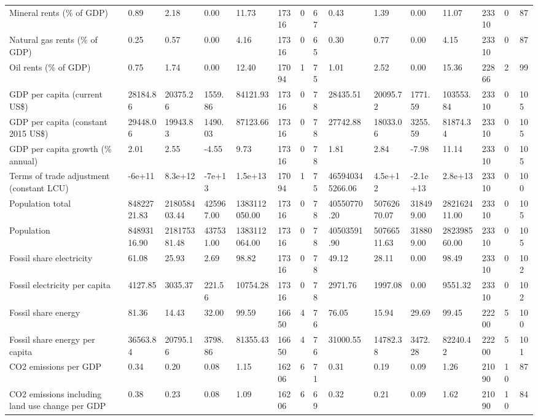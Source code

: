 \begin{longtable}{lllllllllllllll}
\addlinespace
Mineral rents (\% of GDP) & 0.89 & 2.18 & 0.00 & 11.73 & 17316 & 0 & 67 & 0.43 & 1.39 & 0.00 & 11.07 & 23310 & 0 & 87\\
Natural gas rents (\% of GDP) & 0.25 & 0.57 & 0.00 & 4.16 & 17316 & 0 & 65 & 0.30 & 0.77 & 0.00 & 4.15 & 23310 & 0 & 87\\
Oil rents (\% of GDP) & 0.75 & 1.74 & 0.00 & 12.40 & 17094 & 1 & 75 & 1.01 & 2.52 & 0.00 & 15.36 & 22866 & 2 & 99\\
GDP per capita (current US\$) & 28184.86 & 20375.26 & 1559.86 & 84121.93 & 17316 & 0 & 78 & 28435.51 & 20095.72 & 1771.59 & 103553.84 & 23310 & 0 & 105\\
GDP per capita (constant 2015 US\$) & 29448.06 & 19943.83 & 1490.03 & 87123.66 & 17316 & 0 & 78 & 27742.88 & 18033.06 & 3255.59 & 81874.34 & 23310 & 0 & 105\\
\addlinespace
GDP per capita growth (\% annual) & 2.01 & 2.55 & -4.55 & 9.73 & 17316 & 0 & 78 & 1.81 & 2.84 & -7.98 & 11.14 & 23310 & 0 & 105\\
Terms of trade adjustment (constant LCU) & -6e+11 & 8.3e+12 & -7e+13 & 1.5e+13 & 17094 & 1 & 75 & 465940345266.06 & 4.5e+12 & -2.1e+13 & 2.8e+13 & 23310 & 0 & 100\\
Population total & 84822721.83 & 218058403.44 & 425967.00 & 1383112050.00 & 17316 & 0 & 78 & 40550770.20 & 50762670.07 & 318499.00 & 282162411.00 & 23310 & 0 & 105\\
Population & 84893116.90 & 218175381.48 & 437531.00 & 1383112064.00 & 17316 & 0 & 78 & 40503591.90 & 50766511.63 & 318809.00 & 282398560.00 & 23310 & 0 & 105\\
Fossil share electricity & 61.08 & 25.93 & 2.69 & 98.82 & 17316 & 0 & 78 & 49.12 & 28.11 & 0.00 & 98.49 & 23310 & 0 & 102\\
\addlinespace
Fossil electricity per capita & 4127.85 & 3035.37 & 221.56 & 10754.28 & 17316 & 0 & 78 & 2971.76 & 1997.08 & 0.00 & 9551.32 & 23310 & 0 & 102\\
Fossil share energy & 81.36 & 14.43 & 32.00 & 99.59 & 16650 & 4 & 76 & 76.05 & 15.94 & 29.69 & 99.45 & 22200 & 5 & 100\\
Fossil share energy per capita & 36563.84 & 20795.16 & 3798.86 & 81355.43 & 16650 & 4 & 76 & 31000.55 & 14782.38 & 3472.28 & 82240.42 & 22200 & 5 & 101\\
CO2 emissions per GDP & 0.34 & 0.20 & 0.08 & 1.15 & 16206 & 6 & 71 & 0.31 & 0.19 & 0.09 & 1.26 & 21090 & 10 & 87\\
CO2 emissions including land use change per GDP & 0.38 & 0.23 & 0.08 & 1.09 & 16206 & 6 & 69 & 0.32 & 0.21 & 0.09 & 1.62 & 21090 & 10 & 84\\

\end{longtable}

